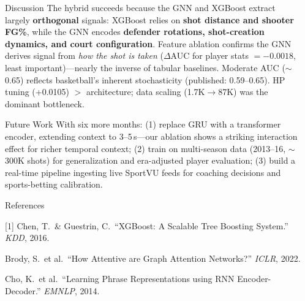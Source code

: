 \documentclass[final]{beamer}
\newlength{\sepwidth}
\newlength{\colwidth}
\newcommand{\separatorcolumn}{\begin{column}{\sepwidth}\end{column}}
\begin{document}
\begin{frame}[t]
\begin{columns}[t]
\begin{column}{\colwidth}
  \begin{block}{Discussion}
    The hybrid succeeds because the GNN and XGBoost extract largely \textbf{orthogonal} signals: XGBoost relies on \textbf{shot distance and shooter FG\%}, while the GNN encodes \textbf{defender rotations, shot-creation dynamics, and court configuration}. Feature ablation confirms the GNN derives signal from \textit{how the shot is taken} ($\Delta$AUC for player stats $= -0.0018$, least important)---nearly the inverse of tabular baselines.
    Moderate AUC ($\sim$0.65) reflects basketball's inherent stochasticity (published: 0.59--0.65). HP tuning (+0.0105) $>$ architecture; data scaling (1.7K$\to$87K) was the dominant bottleneck.
  \end{block}

  \begin{block}{Future Work}
    With six more months: (1) replace GRU with a transformer encoder, extending context to 3--5\,s---our ablation shows a striking interaction effect for richer temporal context; (2) train on multi-season data (2013--16, $\sim$300K shots) for generalization and era-adjusted player evaluation; (3) build a real-time pipeline ingesting live SportVU feeds for coaching decisions and sports-betting calibration.
  \end{block}

  \vspace{-1ex}
  {References}\par\smallskip
  {\scriptsize
  [1] Chen, T.\ \& Guestrin, C.\ ``XGBoost: A Scalable Tree Boosting System.'' \textit{KDD}, 2016.\par
  [2] Brody, S.\ et al.\ ``How Attentive are Graph Attention Networks?'' \textit{ICLR}, 2022.\par
  [3] Cho, K.\ et al.\ ``Learning Phrase Representations using RNN Encoder-Decoder.'' \textit{EMNLP}, 2014.\par
  }

\end{column}

\separatorcolumn
\end{columns}
\end{frame}
\end{document}
